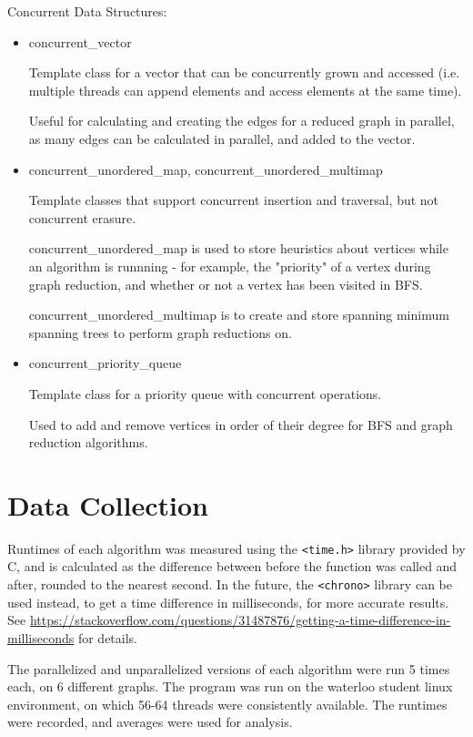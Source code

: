 \documentclass[12pt]{article}
\begin{document}
Concurrent Data Structures:
\begin{itemize}
  \item concurrent\_vector

  Template class for a vector that can be concurrently grown and accessed (i.e. multiple threads can append elements and access elements at the same time). 

  Useful for calculating and creating the edges for a reduced graph in parallel, as many edges can be calculated in parallel, and added to the vector.

  \item concurrent\_unordered\_map, concurrent\_unordered\_multimap

  Template classes that support concurrent insertion and traversal, but not concurrent erasure. 

  concurrent\_unordered\_map is used to store heuristics about vertices while an algorithm is runnning - for example, the "priority" of a vertex during graph reduction, and whether or not a vertex has been visited in BFS.

  concurrent\_unordered\_multimap is to create and store spanning minimum spanning trees to perform graph reductions on.

  \item concurrent\_priority\_queue

  Template class for a priority queue with concurrent operations. 

  Used to add and remove vertices in order of their degree for BFS and graph reduction algorithms.

\end{itemize}

\section{Data Collection}

Runtimes of each algorithm was measured using the \texttt{<time.h>} library provided by C, and is calculated as the difference between before the function was called and after, rounded to the nearest second. In the future, the \texttt{<chrono>} library can be used instead, to get a time difference in milliseconds, for more accurate results. See \url{https://stackoverflow.com/questions/31487876/getting-a-time-difference-in-milliseconds} for details.

The parallelized and unparallelized versions of each algorithm were run 5 times each, on 6 different graphs. The program was run on the waterloo student linux environment, on which 56-64 threads were consistently available. The runtimes were recorded, and averages were used for analysis.
\end{document}
